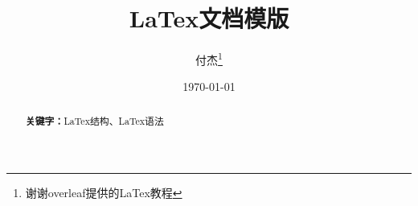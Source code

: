 \documentclass{article}
\title{LaTex文档模版}
\author{付杰\thanks{谢谢overleaf提供的LaTex教程}}
\date{\today}
\newif\ifchinese %
\newif\ifchinese %
\begin{document}
\maketitle
\newpage

\begin{abstract} %
  \par\textbf{关键字：}LaTex结构、LaTex语法
\end{abstract}
\newpage

\tableofcontents %
\newpage


%






  



\end{document}
